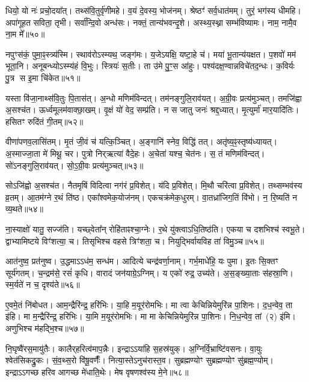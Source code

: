 धियो॒ यो नः॑ प्रचो॒दया᳚त्। तथ्स॑वि॒तुर्वृ॑णीमहे। 
व॒यं दे॒वस्य॒ भोज॑नम्। श्रेष्ठꣳ॑ सर्व॒धात॑मम्। 
तुरं॒ भग॑स्य धीमहि। अपा॑गूहत सविता॒ तृभी\sn। 
सर्वा᳚न्दि॒वो अन्ध॑सः। नक्तं॒ तान्य॑\-भवन्दृ॒शे। 
अस्थ्य॒स्थ्ना सम्भ॑विष्यामः। नाम॒ नामै॒व ना॒म मे᳚॥५०॥


नपुꣳस॑कं॒ पुमा॒ꣴ॒स्त्र्य॑स्मि। स्थाव॑रोऽस्म्यथ॒ जङ्ग॑मः। 
य॒जेऽयक्षि॒ यष्टा॒हे च॑। मया॑ भू॒तान्य॑यक्षत। 
प॒शवो॑ मम॑ भूता॒नि। अनूबन्ध्योऽस्म्य॑हं वि॒भुः। 
स्त्रियः॑ स॒तीः। ता उ॑मे पु॒ꣳ॒स आ॑हुः। 
पश्य॑दक्ष॒ण्वान्नविचे॑तद॒न्धः। क॒विर्यः पु॒त्र स इ॒मा चि॑केत॥५१॥


यस्ता वि॑जा॒नाथ्स॑वि॒तुः पि॒तास॑त्। अ॒न्धो मणिम॑विन्दत्। 
तम॑नङ्गुलि॒राव॑यत्। अ॒ग्री॒वः प्रत्य॑मुञ्चत्। 
तमजि॑ह्वा अ॒सश्च॑त। ऊर्ध्वमूलम॑वाक्छा॒खम्। 
वृ॒क्षं यो॑ वेद॒ सम्प्र॑ति। न स जातु जनः॑ श्रद्द॒ध्यात्। 
मृ॒त्युर्मा॑ मार॒यादि॑तिः। हसितꣳ रुदि॑तं गी॒तम्॥५२॥


वीणा॑पणव॒लासि॑तम्। मृ॒तं जी॒वं च॑ यत्कि॒ञ्चित्। 
अ॒ङ्गानि॑ स्नेव॒ विद्धि॑ तत्। अतृ॑ष्य॒ꣴ॒स्तृष्य॑ध्यायत्। 
अ॒स्माज्जा॒ता मे॑ मिथू॒ चर\snn। पुत्रो निर्‌ऋत्या॑ वैदे॒हः। 
अ॒चेता॑ यश्च॒ चेत॑नः। स॒ तं मणिम॑विन्दत्। 
सो॑ऽनङ्गुलि॒राव॑यत्। सो॒ऽ॒ग्री॒वः प्रत्य॑मुञ्चत्॥५३॥


सोऽजि॑ह्वो अ॒सश्च॑त। नैतमृषिं विदित्वा नग॑रं प्र॒विशेत्। 
य॑दि प्र॒विशेत्। मि॒थौ चरि॑त्वा प्र॒विशेत्। 
तथ्सम्भव॑स्य व्र॒तम्। आ॒तम॑ग्ने र॒थं ति॑ष्ठ। 
एका᳚श्वमेक॒योज॑नम्। एकचक्र॑मेक॒धुरम्। 
वा॒तध्रा॑जिग॒तिं वि॑भो। न॒ रि॒ष्यति॑ न व्य॒थते॥५४॥


ना॒स्याक्षो॑ यातु॒ सज्ज॑ति। यच्छ्वेता᳚न्‌ रोहि॑ताꣴश्चा॒ग्नेः। 
र॒थे यु॑क्त्वाऽधि॒\-तिष्ठ॑ति। एकया च दशभिश्च॑ स्वभू॒ते। 
द्वाभ्यामिष्टये विꣳ॑शत्या॒ च। तिसृभिश्च वहसे त्रिꣳ॑शता॒ च। 
नियुद्भिर्वायविह ता॑ विमु॒ञ्च॥५५॥\anuvakamend


आत॑नुष्व॒ प्रत॑नुष्व। उ॒द्धमाऽऽध॑म॒ सन्ध॑म। 
आदित्ये चन्द्र॑वर्णा॒नाम्। गर्भ॒माधे॑हि॒ यः पुमा\sn{}। 
इ॒तः सि॒क्तꣳ सूर्य॑गतम्। च॒न्द्रम॑से॒ रसं॑ कृधि। 
वारादं जन॑याग्रे॒ऽग्निम्। य एको॑ रुद्र॒ उच्य॑ते। 
अ॒स॒ङ्ख्या॒ताः स॑हस्रा॒णि। स्म॒र्यते॑ न च॒ दृश्य॑ते॥५६॥


ए॒वमे॒तं नि॑बोधत। आम॒न्द्रैरि॑न्द्र॒ हरि॑भिः। 
या॒हि म॒यूर॑रोमभिः। मा त्वा केचिन्नियेमुरि॑न्न पा॒शिनः। 
द॒ध॒न्वेव॒ ता इ॑हि। मा म॒न्द्रैरि॑न्द्र॒ हरि॑भिः। 
या॒मि म॒यूर॑रोमभिः। मा मा केचिन्नियेमुरि॑न्न पा॒शिनः। 
नि॒ध॒न्वेव॒ \mbox{तां (२)} इ॑मि। अणुभिश्च म॑हद्भि॒श्च॥५७॥


नि॒घृष्वै॑रस॒मायु॑तैः। कालैर्‌हरित्व॑माप॒न्नैः। 
इन्द्राऽऽया॑हि स॒हस्र॑युक्। अ॒ग्निर्वि॒भ्राष्टि॑वसनः। 
वा॒युः श्वेत॑सिकद्रु॒कः। सं॒व॒थ्स॒रो वि॑षू॒वर्णैः᳚। 
नित्या॒स्तेऽनुच॑रास्त॒व। सुब्रह्मण्योꣳ सुब्रह्मण्योꣳ सु॑ब्रह्म॒ण्योम्। 
इन्द्राऽऽगच्छ हरिव आगच्छ मे॑धाति॒थेः। मेष वृषणश्व॑स्य मे॒ने॥५८॥


